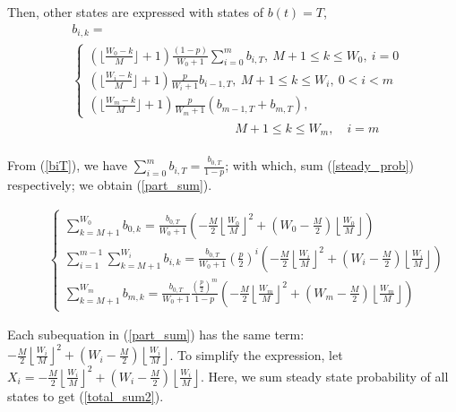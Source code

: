 \documentclass[journal]{IEEEtran}
\newcounter{MYtempeqncnt}
\begin{document}
Then, other states are expressed with states of $b(t)=T$,
\begin{align}
&b_{i,k} =  \nonumber \\
&
\begin{cases}
(\lfloor \frac{W_0-k}{M} \rfloor+1)\frac{(1-p)}{W_0+1}\sum_{i=0}^m b_{i,T}, \  M+1\leq k\leq W_0,\ i = 0\\[3pt]
(\lfloor \frac{W_i-k}{M} \rfloor+1)\frac{p}{W_i+1}b_{i-1,T}, 				\	 M+1 \leq k\leq W_i, \ 0<i<m \\[3pt]
(\lfloor \frac{W_m-k}{M} \rfloor+1)\frac{p}{W_m+1} (b_{m-1,T}+b_{m,T}), 	
\end{cases}\nonumber
\\ &\qquad \qquad \qquad \qquad \quad \qquad \qquad M+1 \leq k\leq W_m, \quad i = m \nonumber \\
\label{steady_prob}
\end{align}

From (\ref{biT}), we have $\sum_{i=0}^m b_{i,T}= \frac{b_{0,T}}{1-p}$; with which, sum (\ref{steady_prob}) respectively; we obtain (\ref{part_sum}).  
\begin{figure}[!t]

\begin{align}
\begin{cases}
\sum_{k=M+1}^{W_0} b_{0,k} = \frac{b_{0,T}}{W_0+1}\left(-\frac{M}{2}\left\lfloor \frac{W_0}{M}\right\rfloor ^2 + \left(W_0-\frac{M}{2}\right)\left\lfloor \frac{W_0}{M} \right\rfloor \right) \\[8pt]
\sum_{i=1}^{m-1}\sum_{k=M+1}^{W_i} b_{i,k} = \frac{b_{0,T}}{W_0+1}\left(\frac{p}{2}\right)^i \left(-\frac{M}{2}\left\lfloor \frac{W_i}{M}\right\rfloor ^2 + \left(W_i-\frac{M}{2}\right)\left\lfloor \frac{W_i}{M} \right\rfloor \right) \\[8pt]
\sum_{k=M+1}^{W_m} b_{m,k} = \frac{b_{0,T}}{W_0+1}\frac{(\frac{p}{2})^m}{1-p}\left(-\frac{M}{2}\left\lfloor \frac{W_m}{M}\right\rfloor ^2 + \left(W_m-\frac{M}{2}\right)\left\lfloor \frac{W_m}{M} \right\rfloor \right) 
\end{cases}
\label{part_sum}
\end{align}
\end{figure}

Each subequation in (\ref{part_sum}) has the same term: $-\frac{M}{2}\left\lfloor \frac{W_i}{M}\right\rfloor ^2 + \left(W_i-\frac{M}{2}\right)\left\lfloor \frac{W_i}{M} \right\rfloor$. To simplify the expression, let $X_i = -\frac{M}{2}\left\lfloor \frac{W_i}{M}\right\rfloor ^2 + \left(W_i-\frac{M}{2}\right)\left\lfloor \frac{W_i}{M} \right\rfloor$. 
Here, we sum steady state probability of all states to get (\ref{total_sum2}).
\end{document}
